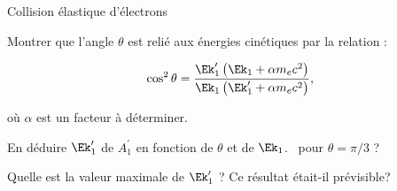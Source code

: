 \begin{exo}[PC][3][TD]{Collision élastique d'électrons}
\begin{quest}
  \item Montrer que l'angle $\theta$ est relié aux énergies cinétiques par la relation :
  
\begin{equation}
  \cos ^{2} \theta=\frac{\Ek_1^{\prime}\left(\Ek_1+\alpha m_{e} c^{2}\right)}{\Ek_1\left(\Ek_1^{\prime}+\alpha m_{e} c^{2}\right)},
\end{equation}

où $\alpha$ est un facteur à déterminer.

  \item En déduire $\Ek_1^{\prime}$ de $A_{1}^{\prime}$ en fonction de $\theta$ et de $\Ek_1$. \AN~pour $\theta=\pi / 3$ ?

  \item Quelle est la valeur maximale de $\Ek_1^{\prime}$ ? Ce résultat était-il prévisible?
  
\end{quest}
\end{exo}


